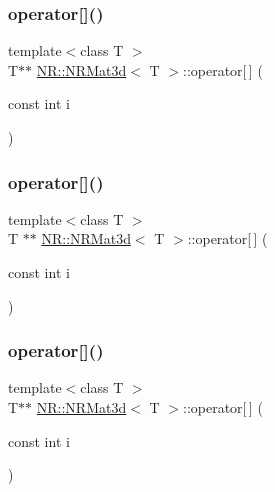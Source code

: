 \mbox{\label{classNR_1_1NRMat3d_a24920cbac3d063139022a4aafee24e4a}} 
\subsubsection{\texorpdfstring{operator[]()}{operator[]()}\hspace{0.1cm}{\footnotesize\ttfamily [1/6]}}
{\footnotesize\ttfamily template$<$class T $>$ \\
T$\ast$$\ast$ \mbox{\hyperlink{classNR_1_1NRMat3d}{N\+R\+::\+N\+R\+Mat3d}}$<$ T $>$\+::operator\mbox{[}$\,$\mbox{]} (\begin{DoxyParamCaption}\item[{const int}]{i }\end{DoxyParamCaption})\hspace{0.3cm}{\ttfamily [inline]}}

\mbox{\label{classNR_1_1NRMat3d_a2a302c22836b7c9872fb837f7c6a64c1}} 
\subsubsection{\texorpdfstring{operator[]()}{operator[]()}\hspace{0.1cm}{\footnotesize\ttfamily [2/6]}}
{\footnotesize\ttfamily template$<$class T $>$ \\
T $\ast$$\ast$ \mbox{\hyperlink{classNR_1_1NRMat3d}{N\+R\+::\+N\+R\+Mat3d}}$<$ T $>$\+::operator\mbox{[}$\,$\mbox{]} (\begin{DoxyParamCaption}\item[{const int}]{i }\end{DoxyParamCaption})\hspace{0.3cm}{\ttfamily [inline]}}

\mbox{\label{classNR_1_1NRMat3d_a24920cbac3d063139022a4aafee24e4a}} 
\subsubsection{\texorpdfstring{operator[]()}{operator[]()}\hspace{0.1cm}{\footnotesize\ttfamily [3/6]}}
{\footnotesize\ttfamily template$<$class T $>$ \\
T$\ast$$\ast$ \mbox{\hyperlink{classNR_1_1NRMat3d}{N\+R\+::\+N\+R\+Mat3d}}$<$ T $>$\+::operator\mbox{[}$\,$\mbox{]} (\begin{DoxyParamCaption}\item[{const int}]{i }\end{DoxyParamCaption})\hspace{0.3cm}{\ttfamily [inline]}}

